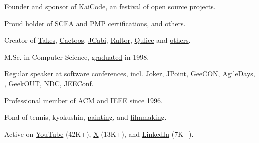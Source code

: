 \documentclass{yb}
\renewcommand\emph[1]{#1}
\begin{document}
Founder and sponsor of \href{https://www.kaicode.org}{\emph{KaiCode}},
  an festival of open source projects.

Proud holder of \emph{\href{https://github.com/yegor256/blog/blob/master/pdf/certifications/OCMJEA-Feb11.pdf}{SCEA}} and
  \emph{\href{https://github.com/yegor256/blog/blob/master/pdf/certifications/PMP-Jun07.pdf}{PMP}} certifications,
  and \href{https://github.com/yegor256/blog/tree/master/pdf/certifications}{others}.

Creator of \href{https://www.takes.org}{Takes},
  \href{https://www.cactoos.org}{Cactoos},
  \href{https://www.jcabi.com}{JCabi},
  \href{https://www.rultor.com}{Rultor},
  \href{https://www.qulice.com}{Qulice} and
  \href{https://www.yegor256.com/pets.html}{others}.

\emph{M.Sc.} in Computer Science,
  \href{https://en.wikipedia.org/wiki/Oles_Honchar_Dnipro_National_University}{graduated} in 1998.

Regular \emph{\href{https://www.yegor256.com/talks.html}{speaker}}
  at software conferences, incl.
  \href{https://youtu.be/55mwAbuDrV8}{Joker},
  \href{https://www.youtube.com/watch?v=20QBvrHq6TA}{JPoint},
  \href{https://vimeo.com/177215750}{GeeCON},
  \href{https://www.youtube.com/watch?v=TLM9eN0b6zo}{AgileDays},
  \href{https://www.youtube.com/watch?v=03PXmPc7Q3g}{},
  \href{https://www.youtube.com/watch?v=7yTIWFZrXpg}{GeekOUT},
  \href{https://www.youtube.com/watch?v=vU_x6oK437I}{NDC},
  \href{https://www.youtube.com/watch?v=GS45LzE3LPQ}{JEEConf}.

Professional member of ACM and IEEE since 1996.

Fond of
  tennis,
  kyokushin,
  \href{https://www.yegor256.com/paintings.html}{painting},
  and
  \href{https://www.imdb.com/name/nm15660607}{filmmaking}.

Active on
  \href{https://www.youtube.com/c/yegor256}{YouTube} (42K+),
  \href{https://twitter.com/intent/follow?screen_name=yegor256}{X} (13K+),
  and
  \href{https://www.linkedin.com/in/yegor256}{LinkedIn} (7K+).
\end{document}
